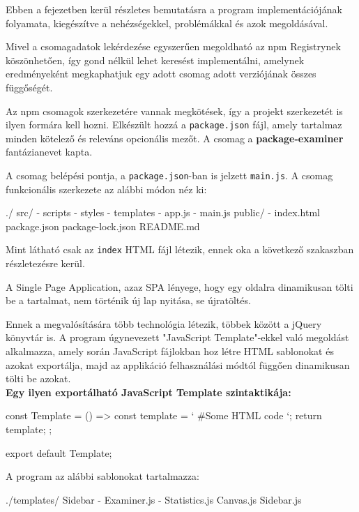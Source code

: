 
Ebben a fejezetben kerül részletes bemutatásra a program implementációjának folyamata, kiegészítve a nehézségekkel, problémákkal és azok megoldásával. 

Mivel a csomagadatok lekérdezése egyszerűen megoldható az npm Registrynek köszönhetően, így gond nélkül lehet keresést implementálni, amelynek eredményeként megkaphatjuk egy adott csomag adott verziójának összes függőségét.

Az npm csomagok szerkezetére vannak megkötések, így a projekt szerkezetét is ilyen formára kell hozni. Elkészült hozzá a \texttt{package.json} fájl, amely tartalmaz minden kötelező és releváns opcionális mezőt. A csomag a \textbf{package-examiner} fantázianevet kapta.   

A csomag belépési pontja, a \texttt{package.json}-ban is jelzett \texttt{main.js}. A csomag funkcionális szerkezete az alábbi módon néz ki:

\begin{js}
./	
	src/
		- scripts
		- styles
		- templates
		- app.js
		- main.js
	public/
		- index.html
	package.json
	package-lock.json
	README.md	
\end{js}

Mint látható csak az \texttt{index} HTML fájl létezik, ennek oka a következő szakaszban részletezésre kerül.

\pagebreak


A Single Page Application, azaz SPA lényege, hogy egy oldalra dinamikusan tölti be a tartalmat, nem történik új lap nyitása, se újratöltés.

Ennek a megvalósítására több technológia létezik, többek között a jQuery könyvtár is. A program úgynevezett "JavaScript Template"-ekkel való megoldást alkalmazza, amely során JavaScript fájlokban hoz létre HTML sablonokat és azokat exportálja, majd az applikáció felhasználási módtól függően dinamikusan tölti be azokat.\\

\textbf{Egy ilyen exportálható JavaScript Template szintaktikája:}

\begin{js}
const Template = () => {
	const template = `
	#Some HTML code
	`;
	return template;
};

export default Template;
\end{js}

A program az alábbi sablonokat tartalmazza:
\begin{js}
./templates/	
	Sidebar
	- Examiner.js
	- Statistics.js
	Canvas.js
	Sidebar.js
\end{js}


